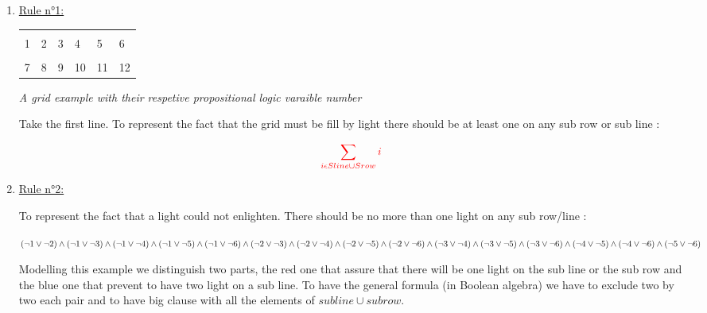 \documentclass[a4paper]{article}
\begin{document}
\begin{enumerate}

	\item \underline{Rule n°1:}
	\medskip
	\newline
	
		\begin{tabular}{|m{}|m{}|m{}|m{}|m{}|m{}|}
        \hline
         \cellcolor[gray]{0.5} &   &   &   &   &   \\[1ex]
         \cellcolor[gray]{0.5} 1 & 2 & 3 & 4 & 5 & 6 \\[2ex]
        \hline
            &   & \cellcolor[gray]{0.5}   &   &   &   \\[1ex]
          7 & 8 & \cellcolor[gray]{0.5} 9 & 10 & 11 & 12 \\[2ex]
        \hline
      \end{tabular}

\textit{A grid example with their respetive propositional logic varaible number}

\newpage

Take the first line. To represent the fact that the grid must be fill by light there should be at least one on any sub row or sub line : 
\begin{center}
$$ \textcolor{red}{\sum_{i \epsilon Sline \cup Srow} i} $$
\end{center} 
	\item \underline{Rule n°2:}
	\medskip
	\newline

To represent the fact that a light could not enlighten. There should be no more than one light on any sub row/line : 
\begin{center}
\textcolor{blue}{$ (\neg1 \lor \neg2) \land (\neg1 \lor \neg 3) \land (\neg 1\lor \neg 4) \land (\neg1\lor \neg5) \land (\neg1 \lor \neg 6) \land (\neg 2 \lor \neg 3) \land (\neg2 \lor \neg 4) \land (\neg 2 \lor \neg5) \newline \land (\neg2 \lor \neg6) \land (\neg3 \lor \neg4) \land (\neg3 \lor \neg5) \land (\neg3 \lor \neg6)  \land (\neg 4 \lor \neg 5) \land (\neg 4 \lor \neg 6)\land(\neg5 \lor \neg6)$}
\end{center} 

Modelling this example we distinguish two parts, the red one that assure that there will be one light on the sub line or the sub row and the blue one that prevent to have two light on a sub line. To have the general formula (in Boolean algebra) we have to exclude two by two each pair and to have big clause with all the elements of $ sub line \cup sub row $. 


\end{enumerate}
\end{document}
